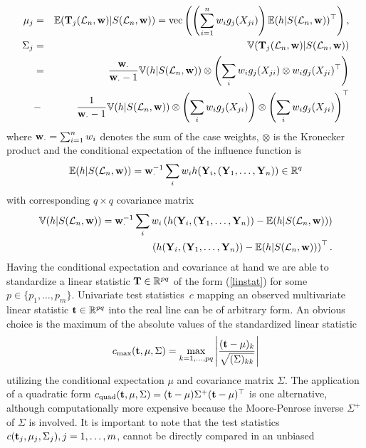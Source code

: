 \begin{eqnarray}
\mu_j & = & \mathbb{E}(\mathbf{T}_j(\mathcal{L}_n, \mathbf{w}) | S(\mathcal{L}_n, \mathbf{w})) = 
\text{vec} \left( \left( \sum_{i = 1}^n w_i g_j(X_{ji}) \right) \mathbb{E}(h | S(\mathcal{L}_n,
\mathbf{w}))^\top
\right), \nonumber \\
\Sigma_j & = & \mathbb{V}(\mathbf{T}_j(\mathcal{L}_n, \mathbf{w}) | S(\mathcal{L}_n, \mathbf{w})) \nonumber \\
& = & 
    \frac{\mathbf{w}_\cdot}{\mathbf{w}_\cdot - 1}  \mathbb{V}(h | S(\mathcal{L}_n, \mathbf{w})) \otimes
        \left(\sum_i w_i  g_j(X_{ji}) \otimes w_i  g_j(X_{ji})^\top \right) \label{expectcovar}
\\
& - & \frac{1}{\mathbf{w}_\cdot - 1}  \mathbb{V}(h | S(\mathcal{L}_n, \mathbf{w}))  \otimes \left(
        \sum_i w_i g_j(X_{ji}) \right)
\otimes \left( \sum_i w_i g_j(X_{ji})\right)^\top 
\nonumber
\end{eqnarray}
where $\mathbf{w}_\cdot = \sum_{i = 1}^n w_i$ denotes the sum of the case weights,
$\otimes$ is the Kronecker product and the conditional expectation of the
influence function is 
\begin{eqnarray*}
\mathbb{E}(h | S(\mathcal{L}_n, \mathbf{w})) = \mathbf{w}_\cdot^{-1} \sum_i w_i h(\mathbf{Y}_i, (\mathbf{Y}_1, \dots, \mathbf{Y}_n)) \in
\mathbb{R}^q
\end{eqnarray*} 
with corresponding $q \times q$ covariance matrix
\begin{eqnarray*}
\mathbb{V}(h | S(\mathcal{L}_n, \mathbf{w})) = \mathbf{w}_\cdot^{-1} \sum_i w_i \left(h(\mathbf{Y}_i, (\mathbf{Y}_1, \dots, \mathbf{Y}_n)) - \mathbb{E}(h | S(\mathcal{L}_n, \mathbf{w}))
\right) \\
\left(h(\mathbf{Y}_i, (\mathbf{Y}_1, \dots, \mathbf{Y}_n)) - \mathbb{E}(h | S(\mathcal{L}_n, \mathbf{w}))\right)^\top.
\end{eqnarray*}
Having the conditional expectation and covariance at hand we are able to
standardize a linear statistic $\mathbf{T} \in \mathbb{R}^{pq}$ of the form
(\ref{linstat}) for some $p \in \{p_1, \dots, p_m\}$. 
Univariate test statistics~$c$ mapping an observed multivariate 
linear statistic $\mathbf{t} \in
\mathbb{R}^{pq}$ into the real line can be of arbitrary form.  An obvious choice is
the maximum of the absolute values of the standardized linear statistic
\begin{eqnarray*}
c_\text{max}(\mathbf{t}, \mu, \Sigma)  = \max_{k = 1, \dots, pq} \left| \frac{(\mathbf{t} -
\mu)_k}{\sqrt{(\Sigma)_{kk}}} \right|
\end{eqnarray*}
utilizing the conditional expectation $\mu$ and covariance matrix
$\Sigma$. The application of a quadratic form $c_\text{quad}(\mathbf{t}, \mu, \Sigma)  = 
(\mathbf{t} - \mu) \Sigma^+ (\mathbf{t} - \mu)^\top$ is one alternative, although
computationally more expensive because the Moore-Penrose 
inverse $\Sigma^+$ of $\Sigma$ is involved.
It is important to note that the test statistics $c(\mathbf{t}_j, \mu_j, \Sigma_j),
j = 1, \dots, m$, cannot be directly compared in an unbiased  
